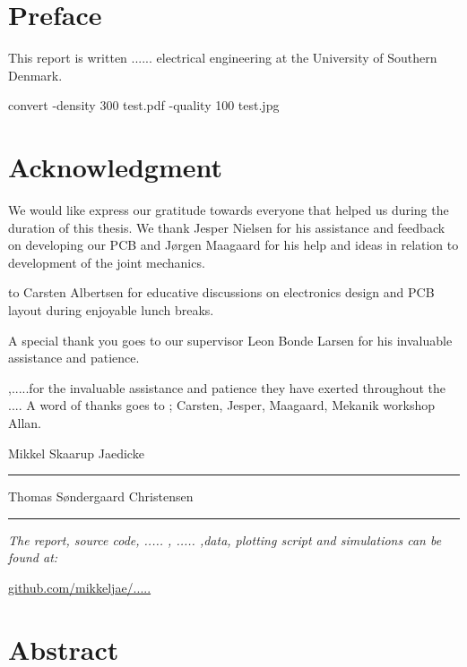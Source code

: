
\section*{Preface}
This report is written ...... electrical engineering at the University of Southern Denmark.

convert -density 300 test.pdf -quality 100 test.jpg

\section*{Acknowledgment}

We would like express our gratitude towards everyone that helped us during the duration of this thesis.
We thank Jesper Nielsen for his assistance and feedback on developing our PCB and Jørgen Maagaard for his help and ideas in relation to development of the joint mechanics. 

to Carsten Albertsen for educative discussions on electronics design and PCB layout during enjoyable lunch breaks. 

A special thank you goes to our supervisor Leon Bonde Larsen for his invaluable assistance and patience.


,.....for the invaluable assistance and patience they have exerted throughout the ....
A word of thanks goes to ; Carsten, Jesper, Maagaard, Mekanik workshop Allan.


\vspace{1cm}
\begin{center}
	\begin{minipage}[t]{.49\textwidth}\large
		\begin{center}
		Mikkel Skaarup Jaedicke\\
		\vspace{1cm}
		\hrule
		\vspace{0.5cm}
		Thomas Søndergaard Christensen
		\vspace{1cm}
		\hrule
		\end{center} 
	\end{minipage}
\end{center}

\vspace{1.2cm}
  \begin{center}
    \textsl{The report, source code, ..... , ..... ,data, plotting script and simulations can be found at:}  
    \end{center}
    \vspace{-5pt}
    \begin{center}
	\renewcommand{\UrlFont}{\color{black}\normalsize\tt}
    \url{github.com/mikkeljae/.....}
   \end{center}
\newpage

\section*{Abstract}
\lipsum[5]
